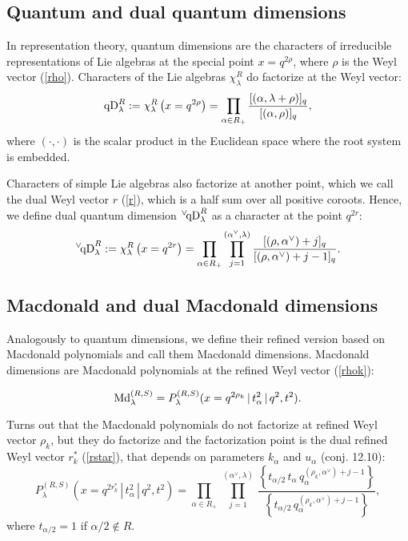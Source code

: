 \documentclass{article}
\def\be{\begin{eqnarray}}
\def\ee{\end{eqnarray}}
\def\MD{\hbox{Md}}%
\def\qDv{{^\vee\!\hbox{qD}}}
\def\qD{\hbox{qD}}
\def\MD{\hbox{Md}}%
\def\qDv{{^\vee\!\hbox{qD}}}
\def\qD{\hbox{qD}}
\def\be{\begin{eqnarray}}
\def\ee{\end{eqnarray}}
\begin{document}
\subsection{Quantum and dual quantum dimensions}
In representation theory, quantum dimensions are the characters of irreducible representations of Lie algebras at the special point $x = q^{2\rho}$, where $\rho$ is the Weyl vector (\ref{rho}).
Characters of the Lie algebras $\chi^{R}_{\lambda}$ do factorize \cite[expr. 13.170]{DiFr} at the Weyl vector:
\begin{equation}\label{qd}
    \qD_{\lambda}^{R}:= \chi^{R}_{\lambda} \left(x = q^{2\rho} \right) =\prod_{\alpha\in R_+} \frac{[(\alpha,\lambda+\rho)]_q}{[(\alpha,\rho)]_q},
\end{equation}
where $(\cdot,\cdot)$ is the scalar product in the Euclidean space where the root system is embedded.

\bigskip

Characters of simple Lie algebras also factorize at another point, which we call the dual Weyl vector $r$ (\ref{r}), which is a half sum over all positive coroots. Hence, we define {dual quantum dimension} $\qDv_{\lambda}^{R}$ as a character at the point $q^{2r}$:
\be
     \qDv_{\lambda}^{R} : = \chi_{\lambda}^R\left(x  = q^{2r} \right)=
\prod_{\alpha \in R_+}\prod_{j=1}^{(\alpha^{\vee},\lambda)} \frac{[(\rho,\alpha^{\vee})+j]_q}{[(\rho,\alpha^{\vee})+j-1]_q}.
\label{qdv}
\ee


\subsection{Macdonald and dual Macdonald dimensions}
Analogously to quantum dimensions, we define their refined version based on Macdonald polynomials and call them Macdonald dimensions. Macdonald dimensions are Macdonald polynomials at the refined Weyl vector (\ref{rhok}):

\begin{equation}
    \MD_{\lambda}^{(R,S)} = P^{(R,S)}_{\lambda}(x = q^{2\rho_k}\,|\, t_{\alpha}^2\,|\, q^2, t^2).
\end{equation}

 Turns out that the Macdonald polynomials do not factorize at refined Weyl vector $\rho_k$,  but they do factorize and the factorization point is the dual refined Weyl vector $r^*_k$ (\ref{rstar}), that depends on parameters $k_\alpha$ and $u_{\alpha}$ \cite{Mac} (conj. 12.10):
\begin{equation}
\boxed{
   P^{(R,S)}_{\lambda}(x = q^{2r^*_k}\,|\, t_{\alpha}^2\,|\, q^2, t^2) =  \prod_{\alpha \in R_+} \, \prod_{j=1}^{(\alpha^{\vee},\lambda)}\,  \frac{\left\{t_{\alpha/2}\, t_{\alpha}\, q_{\alpha}^{(\rho_k,\alpha^{\vee})+j-1}\right\}}{\left\{ t_{\alpha/2}\, q_{\alpha}^{(\rho_k,\alpha^{\vee})+j-1}\right\}}, }
   \label{factor}
\end{equation}
where $t_{\alpha/2} = 1$ if $\alpha/2 \notin R$.
\end{document}
